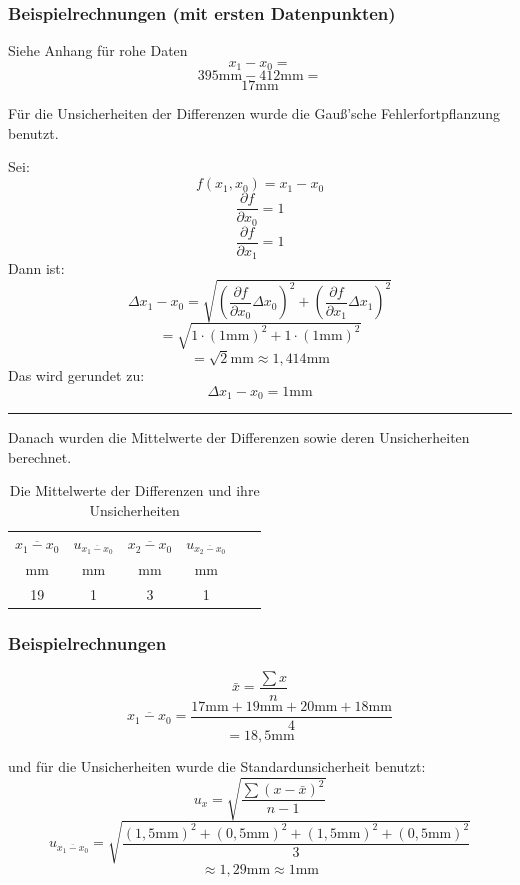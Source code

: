 \documentclass[11pt,a4paper]{article} %
\begin{document}
\subsubsection{Beispielrechnungen (mit ersten Datenpunkten)}

\begin{tcolorbox}[colback=white]
Siehe Anhang für rohe Daten
$$x_1-x_0=$$
$$395\textrm{mm}-412\textrm{mm}=$$
$$17\textrm{mm}$$

Für die Unsicherheiten der Differenzen wurde die Gauß'sche Fehlerfortpflanzung benutzt.

Sei:
$$f(x_1,x_0)=x_1-x_0$$
$$\frac{\partial f}{\partial x_0}=1$$
$$\frac{\partial f}{\partial x_1}=1$$
Dann ist:
$$\Delta{x_1-x_0}=\sqrt{(\frac{\partial f}{\partial x_0}\Delta{x_0})^2+(\frac{\partial f}{\partial x_1}\Delta{x_1})^2}$$
$$=\sqrt{1\cdot(1\textrm{mm})^2+1\cdot(1\textrm{mm})^2}$$
$$=\sqrt{2}\textrm{mm}\approx1,414\textrm{mm}$$
Das wird gerundet zu:
$$\Delta{x_1-x_0}=1\textrm{mm}$$
\end{tcolorbox}
\hrule

\vspace{5mm}
Danach wurden die Mittelwerte der Differenzen sowie deren Unsicherheiten berechnet. 

\begin{table}[h]
	\begin{tabular*}{0.99\textwidth}{@{\extracolsep{\fill}}cccccc}
		\toprule
		$\overline{x_1-x_0}$ & $u_{\overline{x_1-x_0}}$ &  $\overline{x_2-x_0}$  &  $u_{\overline{x_2-x_0}}$  \\
		mm & mm &  mm & mm   \\
		\midrule
		19 & 1 & 3 & 1 \\
		
		\bottomrule
	\end{tabular*}
	\caption{Die Mittelwerte der Differenzen und ihre Unsicherheiten}
	\label{tabelle2}
\end{table}


\subsubsection{Beispielrechnungen}
\begin{tcolorbox}[colback=white]
$$\bar{x}=\frac{\sum x}{n}$$
$$\overline{x_1-x_0}=\frac{17\textrm{mm}+19\textrm{mm}+20\textrm{mm}+18\textrm{mm}}{4}$$
$$=18,5\textrm{mm}$$

und für die Unsicherheiten wurde die Standardunsicherheit benutzt:
\begin{equation}
u_{x}=\sqrt{\frac{\sum(x-\bar{x})^2}{n-1}}
\end{equation}
$$u_{\overline{x_1-x_0}}=\sqrt{\frac{(1,5\textrm{mm})^2+(0,5\textrm{mm})^2+(1,5\textrm{mm})^2+(0,5\textrm{mm})^2}{3}}$$
$$\approx1,29\textrm{mm}\approx1\textrm{mm}$$
\end{tcolorbox}
\vspace{5mm}
\end{document}
